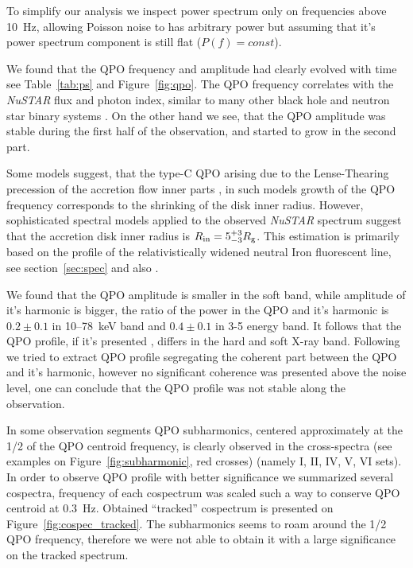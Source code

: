 \documentclass[a4paper,fleqn,usenatbib]{mnras}
\begin{document}
To simplify our analysis we inspect power spectrum only on frequencies above 10~Hz, allowing Poisson noise to has arbitrary power but assuming that it's power spectrum component is still flat ($P(f) = const$).

We found that the QPO frequency and amplitude had clearly evolved with time see Table~\ref{tab:ps} and Figure~\ref{fig:qpo}.
The QPO frequency correlates with the {\it NuSTAR} flux and photon index, similar to many other black hole and neutron star binary systems \citep[see, e.g.,][]{2003A&A...397..729V,2003A&A...407.1039P}.
On the other hand we see, that the QPO amplitude was stable during the first half of the observation, and started to grow in the second part.

Some models suggest, that the type-C QPO arising due to the Lense-Thearing precession of the accretion flow inner parts \citep{1998ApJ...492L..59S, 2006ApJ...642..420S, 2009MNRAS.397L.101I}, in such models growth of the QPO frequency corresponds to the shrinking of the disk inner radius.
However, sophisticated spectral models applied to the observed {\it NuSTAR} spectrum suggest that the accretion disk inner radius is $R_{\rm in}= 5_{-3}^{+3}R_{\rm g}$.
This estimation is primarily based on the profile of the relativistically widened neutral Iron fluorescent line, see section~\ref{sec:spec} and also \citep{miller15_nust}.

We found that the QPO amplitude is smaller in the soft band, while amplitude of it's harmonic is bigger, the ratio of the power in the QPO and it's harmonic is $0.2\pm0.1$ in 10--78~keV band and $0.4\pm0.1$ in 3-5 energy band.
It follows that the QPO profile, if it's presented \citep[see, e.g.][]{2015MNRAS.446.3516I}, differs in the hard and soft X-ray band.
Following \citep{2015MNRAS.446.3516I} we tried to extract  QPO profile segregating the coherent part between the QPO and it's harmonic, however no significant coherence was presented above the noise level, one can conclude that the QPO profile was not stable along the observation. 

In some observation segments QPO subharmonics, centered approximately at the 1/2 of the QPO centroid frequency, is clearly observed in the cross-spectra (see examples on Figure~\ref{fig:subharmonic}, red crosses) (namely I, II, IV, V, VI sets).
In order to observe QPO profile with better significance we summarized several cospectra, frequency of each cospectrum was scaled such a way to conserve QPO centroid at 0.3~Hz.
Obtained ``tracked'' cospectrum is presented on Figure~\ref{fig:cospec_tracked}.
The subharmonics seems to roam around the 1/2 QPO frequency, therefore we were not able to obtain it with a large significance on the tracked spectrum.
\end{document}
